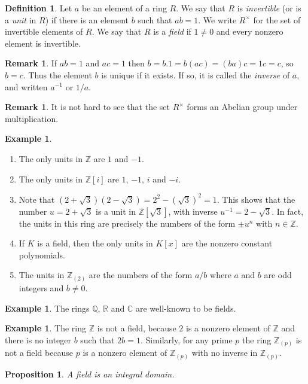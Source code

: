 \documentclass{amsart}
\newcommand{\Z}         {{\mathbb{Z}}}
\newcommand{\Q}         {{\mathbb{Q}}}
\newcommand{\R}         {{\mathbb{R}}}
\newcommand{\rt}        {\sqrt{3}}
\newcommand{\Rt}        {R^\times}
\newcommand{\C}         {{\mathbb{C}}}
\renewcommand{\:}{\colon}
\newtheorem{proposition}[theorem]{Proposition}
\theoremstyle{definition}
\newtheorem{remark}[theorem]{Remark}
\newtheorem{definition}[theorem]{Definition}
\newtheorem{example}[theorem]{Example}
\begin{document}
\begin{definition}
 Let $a$ be an element of a ring $R$.  We say that $R$ is
 \emph{invertible} (or is a \emph{unit} in $R$) if there is an element
 $b$ such that $ab=1$.  We write $\Rt$ for the set of invertible
 elements of $R$.  We say that $R$ is a \emph{field} if $1\neq 0$ and
 every nonzero element is invertible.
\end{definition}
\begin{remark}
 If $ab=1$ and $ac=1$ then $b=b.1=b(ac)=(ba)c=1c=c$, so $b=c$.  Thus
 the element $b$ is unique if it exists.  If so, it is called the
 \emph{inverse} of $a$, and written $a^{-1}$ or $1/a$.  
\end{remark}
\begin{remark}
 It is not hard to see that the set $\Rt$ forms an Abelian group under
 multiplication. 
\end{remark}
\begin{example}
 \begin{enumerate}
 \item The only units in $\Z$ are $1$ and $-1$.
 \item The only units in $\Z[i]$ are $1$, $-1$, $i$ and $-i$.
 \item Note that $(2+\rt)(2-\rt)=2^2-(\rt)^2=1$.  This shows that the
  number $u=2+\rt$ is a unit in $\Z[\rt]$, with inverse
  $u^{-1}=2-\rt$.  In fact, the units in this ring are precisely the
  numbers of the form $\pm u^n$ with $n\in\Z$.
 \item If $K$ is a field, then the only units in $K[x]$ are the
  nonzero constant polynomials.
 \item The units in $\Z_{(2)}$ are the numbers of the form $a/b$ where
  $a$ and $b$ are odd integers and $b\neq 0$.
 \end{enumerate}
\end{example}
\begin{example}
 The rings $\Q$, $\R$ and $\C$ are well-known to be fields.
\end{example}
\begin{example}
 The ring $\Z$ is not a field, because $2$ is a nonzero element of
 $\Z$ and there is no integer $b$ such that $2b=1$.  Similarly, for
 any prime $p$ the ring $\Z_{(p)}$ is not a field because $p$ is a
 nonzero element of $\Z_{(p)}$ with no inverse in $\Z_{(p)}$.
\end{example}
\begin{proposition}
 A field is an integral domain.
\end{proposition}
\end{document}
